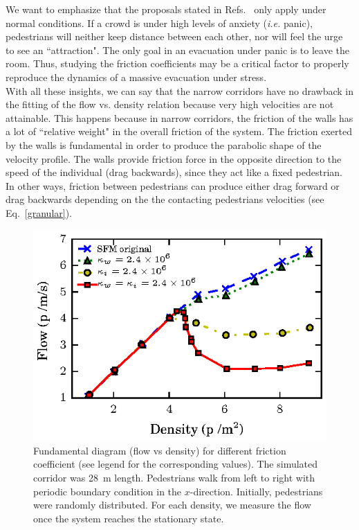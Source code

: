 We want to emphasize that the proposals stated in Refs.~\cite{parisi2,johansson,kwak}  only apply under normal conditions. If a crowd is under high levels of anxiety (\textit{i.e.} panic), pedestrians will neither keep distance between each other, nor will feel the urge to see an ``attraction". The only goal in an evacuation under panic is to leave the room. Thus, studying the friction coefficients may be a critical factor to properly reproduce the dynamics of a massive evacuation under stress.\\

With all these insights, we can say that the narrow corridors have no drawback in the fitting of the flow vs. density relation because very high velocities are not attainable. This happens because in narrow corridors, the friction of the walls has a lot of ``relative weight" in the overall friction of the system. 
The friction exerted by the walls is fundamental in order to produce the parabolic shape of the velocity profile. The walls provide friction force in the opposite direction to the speed of the individual (drag backwards), since they act like a fixed pedestrian. In other ways, friction between pedestrians can produce either drag forward or drag backwards depending on the the contacting pedestrians velocities (see Eq.~\ref{granular}).\\


\begin{figure}[htbp!]
\includegraphics[width=\columnwidth]
{plots/flow-density_pasillo22m_fgmodified_multi.eps}
\caption{\label{fgmodified-w22} Fundamental diagram (flow vs density) for different friction coefficient (see legend for the corresponding values). The simulated corridor was 28~m length. Pedestrians walk from left to right with periodic boundary condition in the $x$-direction. Initially, pedestrians were randomly distributed. For each density, we measure the flow once the system reaches the stationary state.}
\end{figure}

